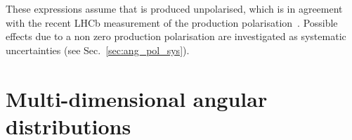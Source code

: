 %
%


These expressions assume that \Lb is produced unpolarised, which is in agreement with the recent LHCb
measurement of the production polarisation~\cite{LHCb-PAPER-2012-057}.
Possible effects due to a non zero production polarisation are investigated as systematic uncertainties (see Sec.~\ref{sec:ang_pol_sys}).


\section{Multi-dimensional angular distributions}
\label{sec:multidim_ang_distrib}

